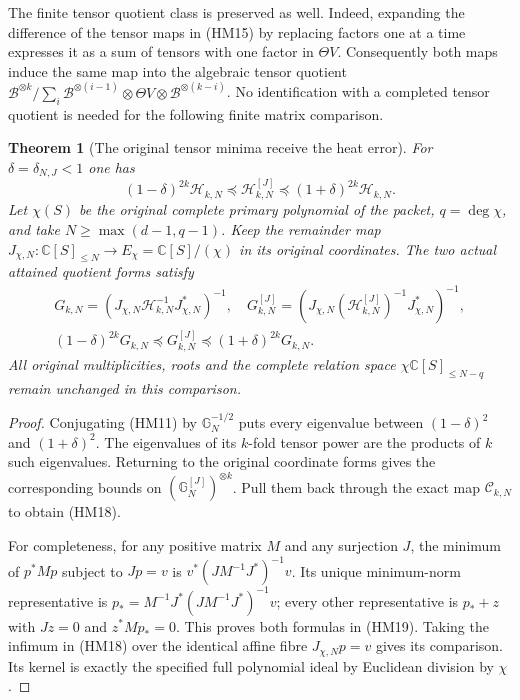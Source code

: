 \documentclass[11pt]{article}
\newcommand{\C}{\mathbb C}\newcommand{\R}{\mathbb R}
\newcommand{\B}{\mathscr B}\newcommand{\M}{\mathcal M}
\newtheorem{theorem}{Theorem}\newtheorem{lemma}[theorem]{Lemma}
\begin{document}
The finite tensor quotient class is preserved as well. Indeed, expanding
the difference of the tensor maps in (HM15) by replacing factors one at
a time expresses it as a sum of tensors with one factor in $\Theta V$.
Consequently both maps induce the same map into the algebraic tensor
quotient $\B^{\otimes k}/\sum_i\B^{\otimes(i-1)}\otimes\Theta V
\otimes\B^{\otimes(k-i)}$. No identification with a completed tensor
quotient is needed for the following finite matrix comparison.

\begin{theorem}[The original tensor minima receive the heat error]
For $\delta=\delta_{N,J}<1$ one has
\begin{equation}\tag{HM18}
 (1-\delta)^{2k}\mathcal H_{k,N}
 \preceq\mathcal H_{k,N}^{[J]}
 \preceq(1+\delta)^{2k}\mathcal H_{k,N}.
\end{equation}
Let $\chi(S)$ be the original complete primary polynomial of the packet,
$q=\deg\chi$, and take $N\ge\max(d-1,q-1)$. Keep the remainder map
$J_{\chi,N}:\C[S]_{\le N}\to E_\chi=\C[S]/(\chi)$ in its original
coordinates. The two actual attained quotient forms satisfy
\begin{equation}\tag{HM19}
 \begin{gathered}
 G_{k,N}=(J_{\chi,N}\mathcal H_{k,N}^{-1}J_{\chi,N}^*)^{-1},\quad
 G_{k,N}^{[J]}=(J_{\chi,N}(\mathcal H_{k,N}^{[J]})^{-1}
                                                   J_{\chi,N}^*)^{-1},\\
 (1-\delta)^{2k}G_{k,N}\preceq G_{k,N}^{[J]}
                                      \preceq(1+\delta)^{2k}G_{k,N}.
 \end{gathered}
\end{equation}
All original multiplicities, roots and the complete relation space
$\chi\C[S]_{\le N-q}$ remain unchanged in this comparison.
\end{theorem}
\begin{proof}
Conjugating (HM11) by $\mathbb G_N^{-1/2}$ puts every eigenvalue
between $(1-\delta)^2$ and $(1+\delta)^2$. The eigenvalues of its
$k$-fold tensor power are the products of $k$ such eigenvalues. Returning
to the original coordinate forms gives the corresponding bounds on
$(\mathbb G_N^{[J]})^{\otimes k}$. Pull them back through the exact
map $\mathcal C_{k,N}$ to obtain (HM18).

For completeness, for any positive matrix $M$ and any surjection $J$,
the minimum of $p^*Mp$ subject to $Jp=v$ is
$v^*(JM^{-1}J^*)^{-1}v$. Its unique minimum-norm representative is
$p_*=M^{-1}J^*(JM^{-1}J^*)^{-1}v$; every other representative is
$p_*+z$ with $Jz=0$ and $z^*Mp_*=0$. This proves both formulas in
(HM19). Taking the infimum in (HM18) over the identical affine fibre
$J_{\chi,N}p=v$ gives its comparison. Its kernel is exactly the
specified full polynomial ideal by Euclidean division by $\chi$.
\end{proof}
\end{document}
